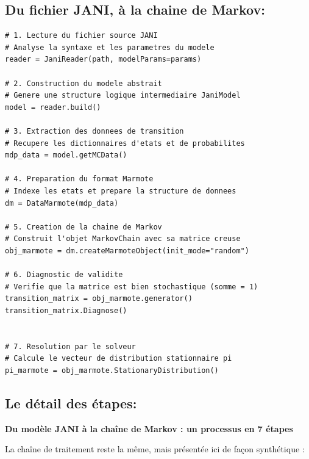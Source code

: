 \documentclass[14pt, a4paper]{extarticle}
\begin{document}
\subsection{Du fichier JANI, à la chaine de Markov:}
\begin{lstlisting}
# 1. Lecture du fichier source JANI
# Analyse la syntaxe et les parametres du modele
reader = JaniReader(path, modelParams=params)

# 2. Construction du modele abstrait
# Genere une structure logique intermediaire JaniModel
model = reader.build()

# 3. Extraction des donnees de transition
# Recupere les dictionnaires d'etats et de probabilites
mdp_data = model.getMCData()

# 4. Preparation du format Marmote
# Indexe les etats et prepare la structure de donnees
dm = DataMarmote(mdp_data)

# 5. Creation de la chaine de Markov
# Construit l'objet MarkovChain avec sa matrice creuse
obj_marmote = dm.createMarmoteObject(init_mode="random")

# 6. Diagnostic de validite
# Verifie que la matrice est bien stochastique (somme = 1)
transition_matrix = obj_marmote.generator()
transition_matrix.Diagnose()
  

# 7. Resolution par le solveur
# Calcule le vecteur de distribution stationnaire pi
pi_marmote = obj_marmote.StationaryDistribution()
\end{lstlisting}


\subsection{Le détail des étapes:}

\begin{center}
  \textbf{Du modèle JANI à la chaîne de Markov : un processus en 7 étapes}
\end{center}

\noindent La chaîne de traitement reste la même, mais présentée ici de façon synthétique :
\end{document}
